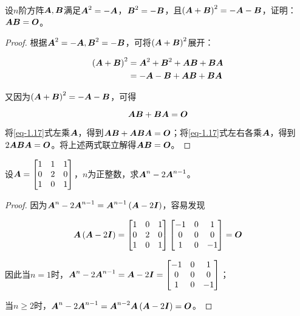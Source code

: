 \begin{problem}\label{problem-1.17}
设\(n\)阶方阵\(\mata,\matb\)满足\(\mata^2=-\mata\)，\(\matb^2=-\matb\)，且\(\mypar{\mata+\matb}^2=-\mata-\matb\)，证明：\(\mata\matb=\mato\)。
\end{problem}
\begin{proof}
    根据\(\mata^2=-\mata,\matb^2=-\matb\)，可将\(\mypar{\mata+\matb}^2\)展开：

    \begin{align*}
        \mypar{\mata+\matb}^2 & =\mata^2+\matb^2+\mata\matb+\matb\mata \\
                              & =-\mata-\matb+\mata\matb+\matb\mata
    \end{align*}

    又因为\(\mypar{\mata+\matb}^2=-\mata-\matb\)，可得

    \begin{equation}\label{eq-1.17}
        \mata\matb+\matb\mata=\mato
    \end{equation}

    将\eqref{eq-1.17}式左乘\(\mata\)，得到\(\mata\matb+\mata\matb\mata=\mato\)；将\eqref{eq-1.17}式左右各乘\(\mata\)，得到\(2\mata\matb\mata=\mato\)。将上述两式联立解得\(\mata\matb=\mato\)。
\end{proof}

\begin{problem}\label{problem-1.18}
设\(\mata=\begin{bmatrix}1&1&1\\0&2&0\\1&0&1\end{bmatrix}\)，\(n\)为正整数，求\(\mata^n-2\mata^{n-1}\)。
\end{problem}
\begin{proof}
    因为\(\mata^n-2\mata^{n-1}=\mata^{n-1}\mypar{\mata-2\mati}\)，容易发现

    \begin{equation*}
        \mata\mypar{\mata-2\mati}=
        \begin{bmatrix}
            1 & 0 & 1 \\0&2&0\\1&0&1
        \end{bmatrix}
        \begin{bmatrix}
            -1 & 0 & 1 \\0&0&0\\1&0&-1
        \end{bmatrix}=\mato
    \end{equation*}

    因此当\(n=1\)时，\(\mata^n-2\mata^{n-1}=\mata-2\mati=\begin{bmatrix}-1 & 0 & 1 \\0&0&0\\1&0&-1\end{bmatrix}\)；

    当\(n\ge2\)时，\(\mata^n-2\mata^{n-1}=\mata^{n-2}\mata\mypar{\mata-2\mati}=\mato\)。
\end{proof}

